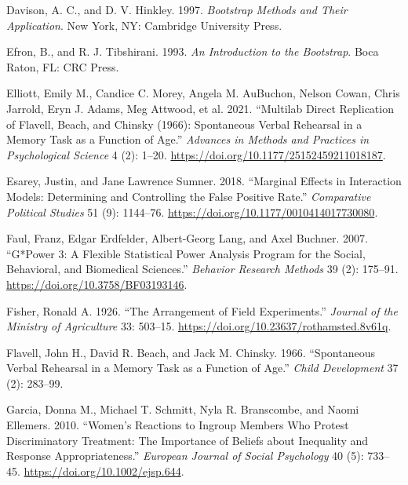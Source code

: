 \documentclass[
  11pt,
  letterpaper,
]{scrbook}
\newlength{\cslhangindent}
\newlength{\cslentryspacingunit} %
\newenvironment{CSLReferences}[2] %
 {%
  \setlength{\parindent}{0pt}
  \ifodd #1
  \let\oldpar\par
  \def\par{\hangindent=\cslhangindent\oldpar}
  \fi
  \setlength{\parskip}{#2\cslentryspacingunit}
 }%
 {}
\theoremstyle{definition}
\theoremstyle{remark}
\begin{document}
\begin{CSLReferences}{1}{0}
\leavevmode{}%
Davison, A. C., and D. V. Hinkley. 1997. \emph{Bootstrap Methods and
Their Application}. New York, NY: Cambridge University Press.

\leavevmode{}%
Efron, B., and R. J. Tibshirani. 1993. \emph{{An Introduction to the
Bootstrap}}. Boca Raton, FL: CRC Press.

\leavevmode{}%
Elliott, Emily M., Candice C. Morey, Angela M. AuBuchon, Nelson Cowan,
Chris Jarrold, Eryn J. Adams, Meg Attwood, et al. 2021. {``Multilab
Direct Replication of {F}lavell, {B}each, and {C}hinsky (1966):
Spontaneous Verbal Rehearsal in a Memory Task as a Function of Age.''}
\emph{Advances in Methods and Practices in Psychological Science} 4 (2):
1--20. \url{https://doi.org/10.1177/25152459211018187}.

\leavevmode{}%
Esarey, Justin, and Jane Lawrence Sumner. 2018. {``Marginal Effects in
Interaction Models: Determining and Controlling the False Positive
Rate.''} \emph{Comparative Political Studies} 51 (9): 1144--76.
\url{https://doi.org/10.1177/0010414017730080}.

\leavevmode{}%
Faul, Franz, Edgar Erdfelder, Albert-Georg Lang, and Axel Buchner. 2007.
{``{G*Power 3}: A Flexible Statistical Power Analysis Program for the
Social, Behavioral, and Biomedical Sciences.''} \emph{Behavior Research
Methods} 39 (2): 175--91. \url{https://doi.org/10.3758/BF03193146}.

\leavevmode{}%
Fisher, Ronald A. 1926. {``The Arrangement of Field Experiments.''}
\emph{Journal of the Ministry of Agriculture} 33: 503--15.
\url{https://doi.org/10.23637/rothamsted.8v61q}.

\leavevmode{}%
Flavell, John H., David R. Beach, and Jack M. Chinsky. 1966.
{``Spontaneous Verbal Rehearsal in a Memory Task as a Function of
Age.''} \emph{Child Development} 37 (2): 283--99.

\leavevmode{}%
Garcia, Donna M., Michael T. Schmitt, Nyla R. Branscombe, and Naomi
Ellemers. 2010. {``Women's Reactions to Ingroup Members Who Protest
Discriminatory Treatment: The Importance of Beliefs about Inequality and
Response Appropriateness.''} \emph{European Journal of Social
Psychology} 40 (5): 733--45. \url{https://doi.org/10.1002/ejsp.644}.


\end{CSLReferences}
\end{document}

